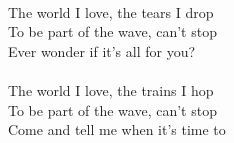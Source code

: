 \\
The world I love, the tears I drop \\
To be part of the wave, can't stop \\
Ever wonder if it's all for you? \\
\\
The world I love, the trains I hop \\
To be part of the wave, can't stop \\
Come and tell me when it's time to \\
